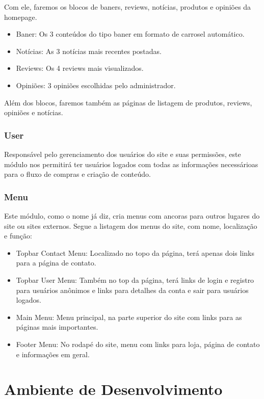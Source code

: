 Com ele, faremos os blocos de baners, reviews, notícias, produtos e opiniões da homepage.
\begin{itemize}
  \item Baner: Os 3 conteúdos do tipo baner em formato de carrosel automático.
  \item Notícias: As 3 notícias mais recentes postadas.
  \item Reviews: Os 4 reviews mais visualizados.
  \item Opiniões: 3 opiniões escolhidas pelo administrador.
\end{itemize}

Além dos blocos, faremos também as páginas de listagem de produtos, reviews, opiniões e notícias.

\subsubsection{User}
Responsável pelo gerenciamento dos usuários do site e suas permissões, este módulo nos permitirá ter usuários logados com todas as informações necessárioas para o fluxo de compras e criação de conteúdo.

\subsubsection{Menu}
Este módulo, como o nome já diz, cria menus com ancoras para outros lugares do site ou sites externos. Segue a listagem dos menus do site, com nome, localização e função:

\begin{itemize}
  \item Topbar Contact Menu: Localizado no topo da página, terá apenas dois links para a página de contato.
  \item Topbar User Menu: Também no top da página, terá links de login e registro para usuários anônimos e links para detalhes da conta e sair para usuários logados.
  \item Main Menu: Menu principal, na parte superior do site com links para as páginas mais importantes.
  \item Footer Menu: No rodapé do site, menu com links para loja, página de contato e informações em geral.
\end{itemize}


\section{Ambiente de Desenvolvimento}

